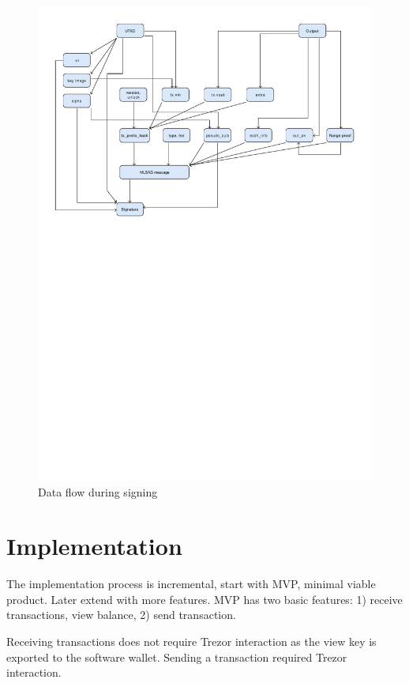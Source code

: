 \documentclass[]{article}
\begin{document}
\begin{figure}[H]
	\centering
	\includegraphics[width=1.\textwidth,trim={0 16cm 0 1cm},clip, angle=0]{data_flow.pdf}
	\caption{Data flow during signing} \label{fig:data_flow}
\end{figure}


\section{Implementation}

The implementation process is incremental, start with MVP, minimal viable product. Later extend with more features. MVP has two basic features: 1) receive transactions, view balance, 2) send transaction. 

Receiving transactions does not require Trezor interaction as the view key is exported to the software wallet. Sending a transaction required Trezor interaction.
\end{document}
